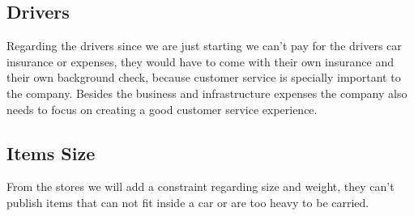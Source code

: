 \documentclass[12pt]{article}
\begin{document}
\pagebreak

\subsection{Drivers}
\noindent Regarding the drivers since we are just starting we can’t pay for the drivers car insurance or expenses, they would have to come with their own insurance and their own background check, because customer service is specially important to the company. Besides the business and infrastructure expenses the company also needs to focus on creating a good customer service experience.\newline

\subsection{Items Size}
\noindent From the stores we will add a constraint regarding size and weight, they can’t publish items that can not fit inside a car or are too heavy to be carried.
\end{document}
